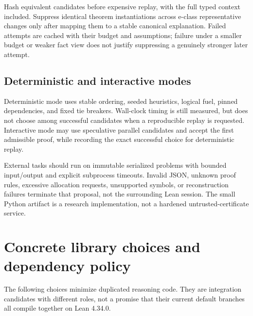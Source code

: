 \documentclass[11pt,a4paper]{article}
\begin{document}
Hash equivalent candidates before expensive replay, with the full typed context included. Suppress identical theorem instantiations across e-class representative changes only after mapping them to a stable canonical explanation. Failed attempts are cached with their budget and assumptions; failure under a smaller budget or weaker fact view does not justify suppressing a genuinely stronger later attempt.

\subsection{Deterministic and interactive modes}

Deterministic mode uses stable ordering, seeded heuristics, logical fuel, pinned dependencies, and fixed tie breakers. Wall-clock timing is still measured, but does not choose among successful candidates when a reproducible replay is requested. Interactive mode may use speculative parallel candidates and accept the first admissible proof, while recording the exact successful choice for deterministic replay.

External tasks should run on immutable serialized problems with bounded input/output and explicit subprocess timeouts. Invalid JSON, unknown proof rules, excessive allocation requests, unsupported symbols, or reconstruction failures terminate that proposal, not the surrounding Lean session. The small Python artifact is a research implementation, not a hardened untrusted-certificate service.

\section{Concrete library choices and dependency policy}
\label{sec:libraries}

The following choices minimize duplicated reasoning code. They are integration candidates with different roles, not a promise that their current default branches all compile together on Lean 4.34.0.
\end{document}
